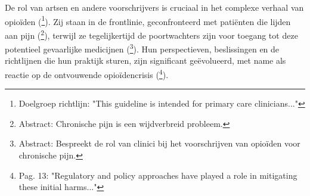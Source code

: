 \documentclass[11pt, a4paper]{report} %
\begin{document}
De rol van artsen en andere voorschrijvers is cruciaal in het complexe verhaal van opioïden (\cite{Dowell2016CDCGuideline}\footnote{Doelgroep richtlijn: "This guideline is intended for primary care clinicians..."}). Zij staan in de frontlinie, geconfronteerd met patiënten die lijden aan pijn (\cite{Cohen2021ChronicPainUpdate}\footnote{Abstract: Chronische pijn is een wijdverbreid probleem.}), terwijl ze tegelijkertijd de poortwachters zijn voor toegang tot deze potentieel gevaarlijke medicijnen (\cite{Hooten2021OpioidsChronicPain}\footnote{Abstract: Bespreekt de rol van clinici bij het voorschrijven van opioïden voor chronische pijn.}). Hun perspectieven, beslissingen en de richtlijnen die hun praktijk sturen, zijn significant geëvolueerd, met name als reactie op de ontvouwende opioïdencrisis (\cite{Maclean2020EconomicStudiesOpioid}\footnote{Pag. 13: "Regulatory and policy approaches have played a role in mitigating these initial harms..."}).
\end{document}
